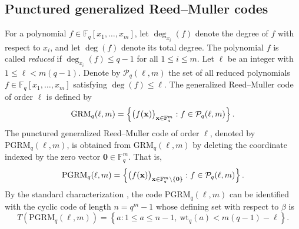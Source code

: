 \documentclass[journal,onecolumn]{IEEEtran}
\newcommand{\wtq}{\mathrm{wt}_q}
\begin{document}
\subsection{Punctured generalized Reed--Muller codes}
For a polynomial
$f\in\mathbb{F}_q[x_1,\ldots,x_m]$, let $\deg_{x_i}(f)$ denote the degree of $f$ with respect to $x_i$, and
let $\deg(f)$ denote its total degree.
The polynomial $f$ is called \emph{reduced} if
$
\deg_{x_i}(f)\leq q-1$
for all $1\leq i\leq  m$.
Let $\ell$ be an integer with $1\leq\ell<m(q-1)$. Denote by
$\mathcal{P}_q(\ell,m)$ the set of all reduced polynomials
$f\in\mathbb{F}_q[x_1,\ldots,x_m]$ satisfying $\deg(f)\leq\ell$.
The generalized Reed--Muller code of order $\ell$ is defined by
\begin{equation}\notag
\mathrm{GRM}_q(\ell,m)
=
\left\{
\bigl(f(\mathbf{x})\bigr)_{\mathbf{x}\in\mathbb{F}_q^m}:
f\in\mathcal{P}_q(\ell,m)
\right\}.
\end{equation}
The punctured generalized Reed--Muller code of order
$\ell$, denoted by $\mathrm{PGRM}_q(\ell,m)$, is obtained from
$\mathrm{GRM}_q(\ell,m)$ by deleting the coordinate indexed by
the zero vector $\mathbf{0}\in\mathbb{F}_q^m$. That is, 
\begin{equation}\notag
\mathrm{PGRM}_q(\ell,m)
=
\left\{
\bigl(f(\mathbf{x})\bigr)_{\mathbf{x}\in\mathbb{F}_q^m \setminus 
\{\mathbf{0}\}}:
f\in\mathcal{P}_q(\ell,m)
\right\}.
\end{equation}
By the standard characterization \cite{DelsarteGoethalsMacWilliams1970,DingLiXia2018},  the code  $\mathrm{PGRM}_q(\ell,m)$ can be identified with the cyclic code of length $n=q^m-1$ whose defining set with respect to $\beta$ is
\begin{equation}\label{eqdef}
T\left(\mathrm{PGRM}_q(\ell,m)\right)
=
\left\{
a:
1\leq a\leq n-1,\ 
\wtq(a)<m(q-1)-\ell
\right\}.
\end{equation}


 
\end{document}
